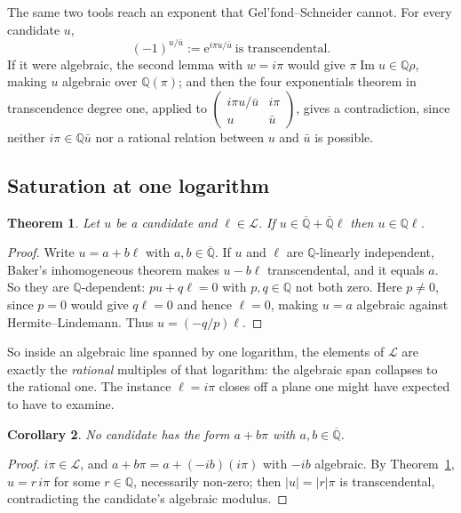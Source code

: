 \documentclass[11pt,a4paper]{article}
\theoremstyle{plain}
\newtheorem{theorem}{Theorem}[section]
\newtheorem{corollary}[theorem]{Corollary}
\theoremstyle{definition}
\newcommand{\e}{\mathrm{e}}
\newcommand{\Q}{\mathbb{Q}}
\newcommand{\Alg}{\overline{\mathbb{Q}}}
\newcommand{\Logs}{\mathcal{L}}
\begin{document}
The same two tools reach an exponent that Gel'fond--Schneider cannot. For every candidate $u$,
\[
  (-1)^{u/\bar u}:=\e^{i\pi u/\bar u}\ \text{is transcendental.}
\]
If it were algebraic, the second lemma with $w=i\pi$ would give $\pi\operatorname{Im}u\in\Q\rho$,
making $u$ algebraic over $\Q(\pi)$; and then the four exponentials theorem in transcendence
degree one, applied to $\begin{pmatrix}i\pi u/\bar u&i\pi\\ u&\bar u\end{pmatrix}$, gives a
contradiction, since neither $i\pi\in\Q\bar u$ nor a rational relation between $u$ and $\bar u$ is
possible.

\subsection*{Saturation at one logarithm}

\begin{theorem}\label{thm:saturation}
Let $u$ be a candidate and $\ell\in\Logs$. If $u\in\Alg+\Alg\ell$ then $u\in\Q\ell$.
\end{theorem}

\begin{proof}
Write $u=a+b\ell$ with $a,b\in\Alg$. If $u$ and $\ell$ are $\Q$-linearly independent, Baker's
inhomogeneous theorem makes $u-b\ell$ transcendental, and it equals $a$. So they are
$\Q$-dependent: $pu+q\ell=0$ with $p,q\in\Q$ not both zero. Here $p\neq0$, since $p=0$ would give
$q\ell=0$ and hence $\ell=0$, making $u=a$ algebraic against Hermite--Lindemann. Thus
$u=(-q/p)\ell$.
\end{proof}

So inside an algebraic line spanned by one logarithm, the elements of $\Logs$ are exactly the
\emph{rational} multiples of that logarithm: the algebraic span collapses to the rational one. The
instance $\ell=i\pi$ closes off a plane one might have expected to have to examine.

\begin{corollary}\label{cor:api}
No candidate has the form $a+b\pi$ with $a,b\in\Alg$.
\end{corollary}

\begin{proof}
$i\pi\in\Logs$, and $a+b\pi=a+(-ib)(i\pi)$ with $-ib$ algebraic. By
Theorem~\ref{thm:saturation}, $u=r\,i\pi$ for some $r\in\Q$, necessarily non-zero; then
$|u|=|r|\pi$ is transcendental, contradicting the candidate's algebraic modulus.
\end{proof}
\end{document}

